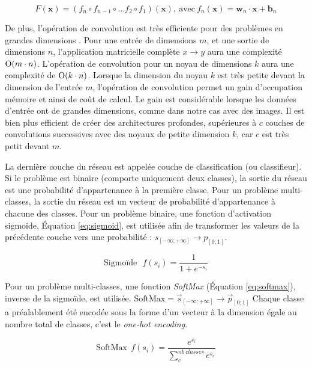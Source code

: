 \begin{equation} \label{eq:deep_function}
F(\mathbf{x}) = \left(f_{n} \circ f_{n-1} \circ \ldots f_{2} \circ f_{1}\right)(\mathbf{x}), \ \text{avec} \ f_n(\mathbf{x}) = \mathbf{w}_n \cdot \mathbf{x} + \mathbf{b}_n
\end{equation}

De plus, l'opération de convolution est très efficiente pour des problèmes en grandes dimensions \cite{goodfellow_deep_2016}.
Pour une entrée de dimensions $m$, et une sortie de dimensions $n$, l'application matricielle complète $x \rightarrow y$ aura une complexité $\operatorname{O}(m \cdot n)$.
L'opération de convolution pour un noyau de dimensions $k$ aura une complexité de $\operatorname{O}(k \cdot n)$.
Lorsque la dimension du noyau $k$ est très petite devant la dimension de l'entrée $m$, l'opération de convolution permet un gain d'occupation mémoire et ainsi de coût de calcul.
Le gain est considérable lorsque les données d'entrée ont de grandes dimensions, comme dans notre cas avec des images.
Il est bien plus efficient de créer des architectures profondes, supérieures à $c$ couches de convolutions successives avec des noyaux de petite dimension $k$, car $c$ est très petit devant $m$.

La dernière couche du réseau est appelée couche de classification (ou classifieur).
Si le problème est binaire (comporte uniquement deux classes), la sortie du réseau est une probabilité d'appartenance à la première classe.
Pour un problème multi-classes, la sortie du réseau est un vecteur de probabilité d'appartenance à chacune des classes.
Pour un problème binaire, une fonction d'activation sigmoïde, Équation \ref{eq:sigmoid}, est utilisée afin de transformer les valeurs de la précédente couche vers une probabilité : $s_{[-\infty; +\infty]} \to p_{[0 ; 1]}$.

\begin{equation} \label{eq:sigmoid}
\text{Sigmoïde} \ \ \ f\left(s_{i}\right)=\frac{1}{1+e^{-s_{i}}}
\end{equation}

Pour un problème multi-classes, une fonction \textit{SoftMax} (Équation \ref{eq:softmax}), inverse de la sigmoïde, est utilisée.
$\text{SoftMax} = \vec{s}_{[-\infty; +\infty]} \to \vec{p}_{[0 ; 1]}$
Chaque classe a préalablement été encodée sous la forme d'un vecteur à la dimension égale au nombre total de classes, c'est le \textit{one-hot encoding}.

\begin{equation} \label{eq:softmax}
\text{SoftMax} \ \ f(s_{i})=\frac{e^{s_{i}}}{\sum_{c}^{nb \ classes} e^{s_{c}}}
\end{equation}


